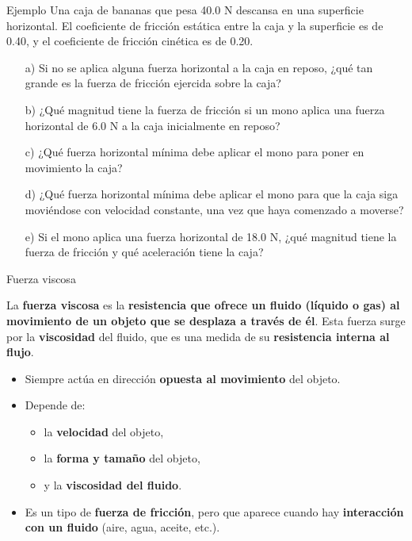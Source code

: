 \begin{frame}{Ejemplo}
    Una caja de bananas que pesa 40.0 N descansa en una superficie horizontal. El coeficiente de fricción estática entre la caja y la
superficie es de 0.40, y el coeficiente de fricción cinética es de 0.20.
\begin{itemize}
    \item[a)] Si no se aplica alguna fuerza horizontal a la caja en reposo, ¿qué tan grande es la fuerza de fricción ejercida sobre la caja?
    \item[b)] ¿Qué magnitud tiene la fuerza de fricción si un mono aplica una fuerza horizontal de 6.0 N a la caja inicialmente en reposo?
    \item[c)] ¿Qué fuerza horizontal mínima debe aplicar el mono para poner en movimiento la caja?
    \item[d)] ¿Qué fuerza horizontal mínima debe aplicar el mono para que la
caja siga moviéndose con velocidad constante, una vez que haya comenzado a moverse?
\item[e)] Si el mono aplica una fuerza horizontal de 18.0 N, ¿qué magnitud tiene la fuerza de fricción y qué aceleración
tiene la caja?
\end{itemize}

\end{frame}

\begin{frame}{Fuerza viscosa}

La \textbf{fuerza viscosa} es la \textbf{resistencia que ofrece un fluido (líquido o gas) al movimiento de un objeto que se desplaza a través de él}.  
Esta fuerza surge por la \textbf{viscosidad} del fluido, que es una medida de su \textbf{resistencia interna al flujo}.

\begin{itemize}
    \item Siempre actúa en dirección \textbf{opuesta al movimiento} del objeto.
    \item Depende de:
    \begin{itemize}
        \item la \textbf{velocidad} del objeto,
        \item la \textbf{forma y tamaño} del objeto,
        \item y la \textbf{viscosidad del fluido}.
    \end{itemize}
    \item Es un tipo de \textbf{fuerza de fricción}, pero que aparece cuando hay \textbf{interacción con un fluido} (aire, agua, aceite, etc.).
\end{itemize}

\end{frame}

